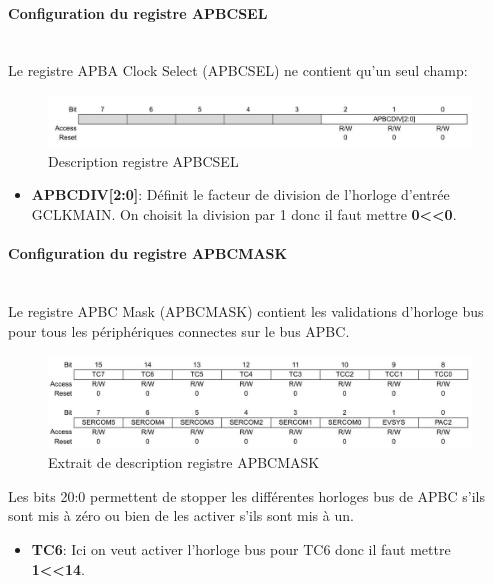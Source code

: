 \documentclass[a4paper]{article}
\begin{document}
	\paragraph{Configuration du registre APBCSEL} 
	~~\\
	Le registre APBA Clock Select (APBCSEL) ne contient qu'un seul champ:\\
	\begin{figure}[H]
		\centering
		\includegraphics[width=0.9\linewidth]{APBCSEL.jpg}
		\caption{Description registre APBCSEL}
	\end{figure}
	
	\begin{itemize}
		\item {\bf APBCDIV[2:0]}: Définit le facteur de division de l'horloge d'entrée GCLKMAIN. On choisit la division par 1 donc il faut mettre {\bf 0\textless\textless0}.~~\\
	\end{itemize}
	
	\paragraph{Configuration du registre APBCMASK} 
	~~\\
	Le registre APBC Mask (APBCMASK) contient les validations d'horloge bus pour tous les périphériques connectes sur le bus APBC.
	\begin{figure}[H]
		\centering
		\includegraphics[width=0.9\linewidth]{APBCMASK.jpg}
		\caption{Extrait de description registre APBCMASK}
	\end{figure}
	Les bits 20:0 permettent de stopper les différentes horloges bus de APBC s’ils sont mis à zéro ou bien de les activer s’ils sont mis à un.
	\begin{itemize}
		\item {\bf TC6}: Ici on veut activer l’horloge bus pour TC6 donc il faut mettre {\bf 1\textless\textless14}.~~\\
	\end{itemize}
	
\end{document}
